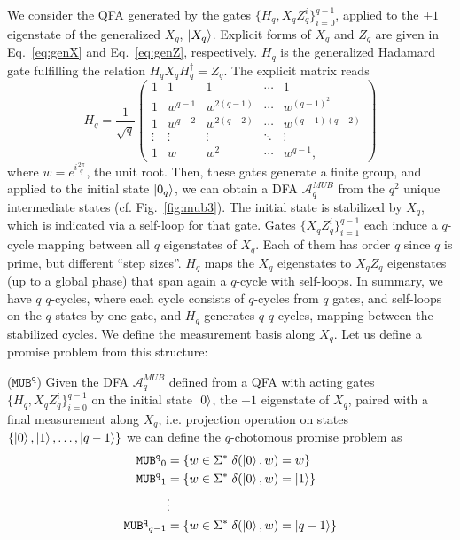 \documentclass[../main.tex]{subfiles}
\begin{document}
We consider the QFA generated by the gates $\{H_q,X_qZ_q^i\}_{i=0}^{q-1}$, applied to the $+1$ eigenstate of the generalized $X_q$, $\ket{X_q}$. Explicit forms of $X_q$ and $Z_q$ are given in Eq.~\ref{eq:genX} and Eq.~\ref{eq:genZ}, respectively. $H_q$ is the generalized Hadamard gate fulfilling the relation $H_q X_q H_q^\dagger = Z_q$. The explicit matrix reads \cite{pudda2024generalised}
\begin{equation}
    H_q = \frac{1}{\sqrt{q}}
    \begin{pmatrix}
            1 & 1 & 1 & \cdots & 1 \\
            1 & w^{q-1} & w^{2(q-1)} & \cdots & w^{(q-1)^2} \\
            1 & w^{q-2} & w^{2(q-2)} & \cdots & w^{(q-1)(q-2)} \\
            \vdots & \vdots & \vdots & \ddots & \vdots \\
            1 & w & w^{2} & \cdots & w^{q-1},
    \end{pmatrix}    
\end{equation}
    where $w = e^{i \frac{2\pi}{q}}$, the unit root. Then, these gates generate a finite group, and applied to the initial state $\ket{0_q}$, we can obtain a DFA $\mathcal{A}^{MUB}_{q}$ from the $q^2$ unique intermediate states (cf. Fig.~\ref{fig:mub3}). The initial state is stabilized by $X_q$, which is indicated via a self-loop for that gate. Gates $\{X_qZ_q^i\}_{i=1}^{q-1}$ each induce a $q$-cycle mapping between all $q$ eigenstates of $X_q$. Each of them has order $q$ since $q$ is prime, but different ``step sizes''. $H_q$ maps the $X_q$ eigenstates to $X_q Z_q$ eigenstates (up to a global phase) that span again a $q$-cycle with self-loops. In summary, we have $q$ $q$-cycles, where each cycle consists of $q$-cycles from $q$ gates, and self-loops on the $q$ states by one gate, and $H_q$ generates $q$ $q$-cycles, mapping between the stabilized cycles. We define the measurement basis along $X_q$. Let us define a promise problem from this structure:

    
    \begin{definition} \label{def:mub} ($\mathtt{MUB^q}$)
        Given the \ac{DFA}  $\mathcal{A}^{MUB}_{q}$ defined from a \ac{QFA} with acting gates $\{H_q,X_qZ_q^i\}_{i=0}^{q-1}$ on the initial state $\ket{0}$, the $+1$ eigenstate of $X_q$, paired with a final measurement along $X_q$, i.e. projection operation on states $\{\ket{0},\ket{1},\dots,\ket{q-1}\}$ we can define the $q$-chotomous promise problem as
        \begin{align}
            \mathtt{MUB^q}_0  &= \{ w \in \Sigma^* | \delta(\ket{0},w) = w \} \\
            \mathtt{MUB^q}_1 &= \{ w \in \Sigma^* | \delta(\ket{0},w) = \ket{1} \} \\
            &\vdots \\
            \mathtt{MUB^q}_{q-1} &= \{ w \in \Sigma^* | \delta(\ket{0},w) = \ket{q-1} \}
        \end{align}
    \end{definition}
\end{document}
